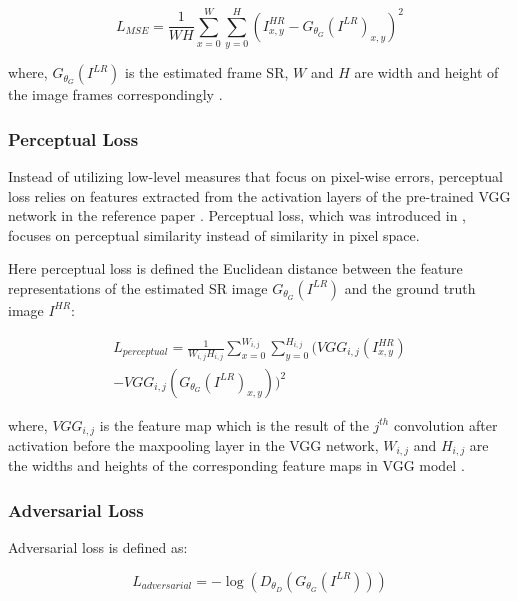\documentclass[conference]{IEEEtran}
\begin{document}
\begin{equation} \label{eq:mse_loss}
	L_{MSE} = \frac{1}{WH} \sum_{x=0}^{W} \sum_{y=0}^{H} ( I^{HR}_{x,y} - G_{\theta_G} (I^{LR})_{x,y} )^2
\end{equation}

where, $G_{\theta_G} (I^{LR})$ is the estimated frame SR, $W$ and $H$ are width and height of the image frames correspondingly \cite{iSeeBetter_2020}.

\subsubsection{Perceptual Loss \label{sec:perceptual_loss}}

Instead of utilizing low-level measures that focus on pixel-wise errors, perceptual loss relies on features extracted from the activation layers of the pre-trained VGG network in the reference paper \cite{vgg_very_deep_cnn_2014}. Perceptual loss, which was introduced in \cite{sr_with_deep_conv_sufficient_stats_2015, texture_synth_cnn_2015}, focuses on perceptual similarity instead of similarity in pixel space.

Here perceptual loss is defined the Euclidean distance between the feature representations of the estimated SR image $G_{\theta_G} (I^{LR})$ and the ground truth image $I^{HR}$:

\begin{gather*} %
	L_{perceptual} = \frac{1}{W_{i,j} H_{i,j}} \sum_{x=0}^{W_{i,j}} \sum_{y=0}^{H_{i,j}} ( VGG_{i,j} (I^{HR}_{x,y}) \\- VGG_{i,j} (G_{\theta_G} (I^{LR})_{x,y}) )^2
\end{gather*}

where, $VGG_{i,j}$ is the feature map which is the result of the $j^{th}$ convolution after activation before the maxpooling layer in the VGG network, $W_{i,j}$ and $H_{i,j}$  are the widths and heights of the corresponding feature maps in VGG model \cite{iSeeBetter_2020}.

\subsubsection{Adversarial Loss\label{sec:adversarial_loss}}

Adversarial loss is defined as:

\begin{equation} \label{eq:adversarial_loss}
	L_{adversarial} = -\log ( D_{\theta_D}( G_{\theta_G} (I^{LR}) ) )
\end{equation}
\end{document}
